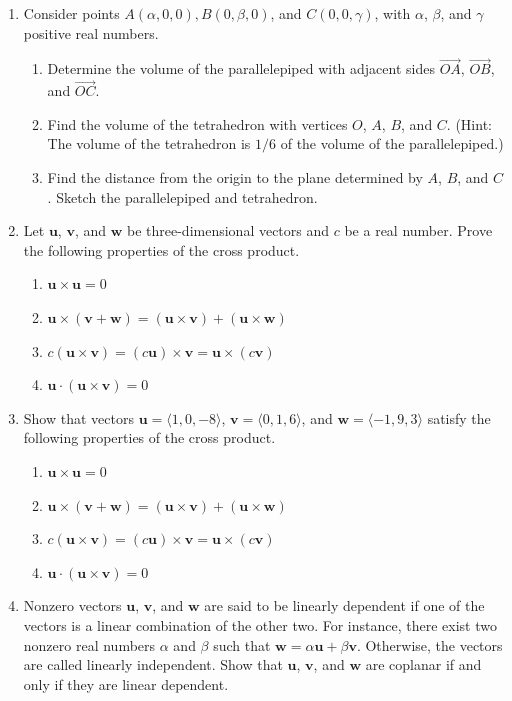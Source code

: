 \documentclass{exercises}
\begin{document}
\begin{enumerate}[resume]
\begin{enumerate}[label=(\alph*)]
\end{enumerate}
\item Consider points $A(\alpha,0,0),B(0,\beta,0)$, and $C(0,0,\gamma)$, with $\alpha$, $\beta$, and $\gamma$ positive real numbers.
\begin{enumerate}[label=(\alph*)]
  \item Determine the volume of the parallelepiped with adjacent sides $\overset{\to}{OA}$, $\overset{\to}{OB}$, and $\overset{\to}{OC}$.
  \item Find the volume of the tetrahedron with vertices $O$, $A$, $B$, and $C$. (Hint: The volume of the tetrahedron is $1/6$ of the volume of the parallelepiped.)
  \item Find the distance from the origin to the plane determined by $A$, $B$, and $C$. Sketch the parallelepiped and tetrahedron.
\end{enumerate}
\item Let $\mathbf{u}$, $\mathbf{v}$, and $\mathbf{w}$ be three-dimensional vectors and $c$ be a real number. Prove the following properties of the cross product.
\begin{enumerate}[label=(\alph*)]
  \item $\mathbf{u}\times \mathbf{u}=0$
  \item $\mathbf{u}\times (\mathbf{v}+\mathbf{w})=(\mathbf{u}\times \mathbf{v})+(\mathbf{u}\times \mathbf{w})$
  \item $c(\mathbf{u}\times \mathbf{v})=(c\mathbf{u})\times \mathbf{v}=\mathbf{u}\times (c\mathbf{v})$
  \item $\mathbf{u}\cdot(\mathbf{u}\times \mathbf{v})=0$
\end{enumerate}
\item Show that vectors $\mathbf{u}=\langle1,0,-8\rangle$, $\mathbf{v}=\langle0,1,6\rangle$, and $\mathbf{w}=\langle-1,9,3\rangle$ satisfy the following properties of the cross product.
\begin{enumerate}[label=(\alph*)]
  \item $\mathbf{u}\times \mathbf{u}=0$
  \item $\mathbf{u}\times (\mathbf{v}+\mathbf{w})=(\mathbf{u}\times \mathbf{v})+(\mathbf{u}\times \mathbf{w})$
  \item $c(\mathbf{u}\times \mathbf{v})=(c\mathbf{u})\times \mathbf{v}=\mathbf{u}\times (c\mathbf{v})$
  \item $\mathbf{u}\cdot(\mathbf{u}\times \mathbf{v})=0$
\end{enumerate}
\item Nonzero vectors $\mathbf{u}$, $\mathbf{v}$, and $\mathbf{w}$ are said to be linearly dependent if one of the vectors is a linear combination of the other two. For instance, there exist two nonzero real numbers $\alpha$ and $\beta$ such that $\mathbf{w}=\alpha \mathbf{u}+\beta \mathbf{v}$. Otherwise, the vectors are called linearly independent. Show that $\mathbf{u}$, $\mathbf{v}$, and $\mathbf{w}$ are coplanar if and only if they are linear dependent.

\end{enumerate}
\end{document}
